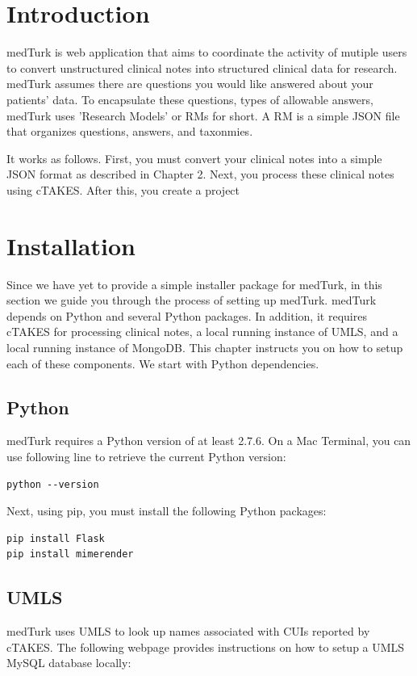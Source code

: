 \documentclass{book}
\begin{document}
\tableofcontents

\mainmatter

\chapter{Introduction}
medTurk is web application that aims to coordinate the activity of mutiple users to convert unstructured clinical notes into structured clinical data for research. medTurk assumes there are questions you would like answered about your patients' data. To encapsulate these questions, types of allowable answers, medTurk uses 'Research Models' or RMs for short. A RM is a simple JSON file that organizes questions, answers, and taxonmies. 

It works as follows. First, you must convert your clinical notes into a simple JSON format as described in Chapter 2. Next, you process these clinical notes using cTAKES. After this, you create a project 


\chapter{Installation}
Since we have yet to provide a simple installer package for medTurk, in this section we guide you through the process of setting up medTurk. medTurk depends on Python and several Python packages. In addition, it requires cTAKES for processing clinical notes, a local running instance of UMLS, and a local running instance of MongoDB. This chapter instructs you on how to setup each of these components. We start with Python dependencies.

\section{Python}
medTurk requires a Python version of at least 2.7.6. On a Mac Terminal, you can use following line to retrieve the current Python version:
\begin{verbatim}
python --version
\end{verbatim}
Next, using pip, you must install the following Python packages:
\begin{verbatim}
pip install Flask
pip install mimerender
\end{verbatim}


\section{UMLS}
medTurk uses UMLS to look up names associated with CUIs reported by cTAKES. The following webpage provides instructions on how to setup a UMLS MySQL database locally:
\end{document}
